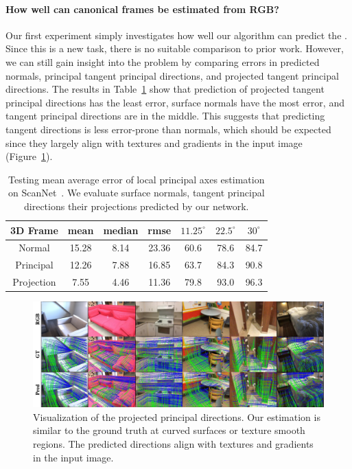 \vspace{-0.1in}
\paragraph{How well can canonical frames be estimated from RGB?}  Our first experiment simply investigates how well our algorithm can predict the \cframe{}.   Since this is a new task, there is no suitable comparison to prior work.   However, we can still gain insight into the problem by comparing errors in predicted normals, principal tangent principal directions, and projected tangent principal directions.   The results in Table~\ref{tab:framenet-3dframe} show that prediction of projected tangent principal directions has the least error, surface normals have the most error, and tangent principal directions are in the middle.   This suggests that predicting tangent directions is less error-prone than normals, which should be expected since they largely align with textures and gradients in the input image (Figure~\ref{fig:framenet-project}). 

\begin{table}[t]
    \centering
    \small
    \tabcolsep=0.12cm
    \begin{tabular}{|c|c|c|c||c|c|c|}
        \hline
         \textbf{3D Frame} & mean & median & rmse & $11.25^\circ$ & $22.5^\circ$ & $30^\circ$\\
         \hline
         Normal & 15.28 & 8.14 & 23.36 & 60.6 & 78.6 & 84.7\\
         \hline
         Principal & 12.26 & 7.88 & 16.85 & 63.7 & 84.3 & 90.8\\
         \hline
         Projection & 7.55 & 4.46 & 11.36 & 79.8 & 93.0 & 96.3\\
         \hline
    \end{tabular}
    \caption{Testing mean average error of local principal axes estimation on ScanNet~\cite{dai2017scannet}. We evaluate surface normals, tangent principal directions their projections predicted by our network.}
    \label{tab:framenet-3dframe}
\end{table}

\begin{figure}[t]
    \centering
    \includegraphics[width=\linewidth]{FrameNet/graph/result-ours.pdf}
    \caption{Visualization of the projected principal directions. Our estimation is similar to the ground truth at curved surfaces or texture smooth regions. The predicted directions align with textures and gradients in the input image.}
    \label{fig:framenet-project}
\end{figure}

